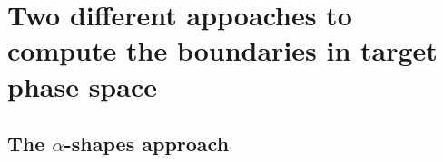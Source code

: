 \chapter{Two different appoaches to compute the boundaries in target phase space}\label{chap:triangulation}
\section{The $\alpha$-shapes approach}

